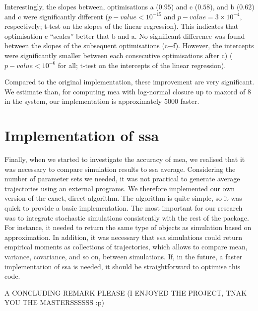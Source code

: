 Interestingly, the slopes between, optimisations a ($0.95$) and c ($0.58$), and b ($0.62$) and c were significantly different ($p-value <10^{-15}$ and $p-value = 3 \times 10^{-4}$, respectively;
t-test on the slopes of the linear regression). This indicates that optimisation c ``scales'' better that b and a.
No significant difference was found between the slopes of the subsequent optimisations (c$-$f).
However, the intercepts were significantly smaller between each consecutive optimisations after c) ($p-value < 10^{-6}$ for all; t-test on the intercepts of the linear regression).

Compared to the original \mat{} implementation, these improvement are very significant. We estimate than, for computing \gls{mea} with log-normal closure up to \gls{maxord}
of 8 in the \pft{} system, our implementation is approximately 5000 faster.

\section{Implementation of \acrlong{ssa}}
Finally, when we started to investigate the accuracy of \gls{mea}, we realised that it was necessary to compare simulation results to \gls{ssa} average\cite{gillespie_general_1976}.
Considering the number of parameter sets we needed, it was not practical to generate average trajectories using an external programs.
We therefore implemented our own version of the exact, direct algorithm.
The algorithm is quite simple, so it was quick to provide a basic implementation.
The most important for our research was to integrate stochastic simulations consistently with the rest of the package.
For instance, it needed to return the same type of objects as simulation based on approximation.
In addition, it was necessary that \gls{ssa} simulations could return empirical moments as collections of trajectories,
which allows to compare mean, variance, covariance, and so on, between simulations.
If, in the future, a faster implementation of \gls{ssa} is needed, it should be straightforward to optimise this code.

A CONCLUDING REMARK PLEASE (I ENJOYED THE PROJECT, TNAK YOU THE MASTERSSSSSS :p)
